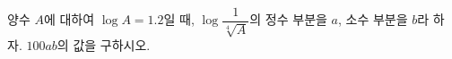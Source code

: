 양수 $A$에 대하여 $\log A=1.2$일 때, $\log\dfrac{1}{\sqrt[4]{A}}$의 정수 부분을 $a$, 소수 부분을 $b$라 하자. $100ab$의 값을 구하시오.
